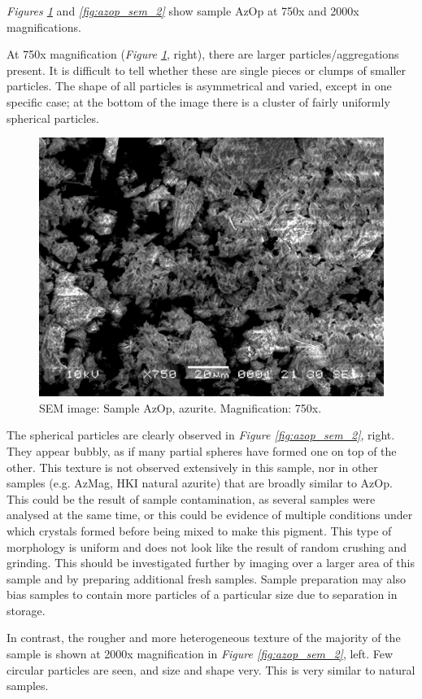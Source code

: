 
\textit{Figures \ref{fig:azop_sem_1}} and \textit{\ref{fig:azop_sem_2}} show sample AzOp at 750x and 2000x magnifications. 

At 750x magnification (\textit{Figure \ref{fig:azop_sem_1}}, right), there are larger particles/aggregations present. It is difficult to tell whether these are single pieces or clumps of smaller particles. The shape of all particles is asymmetrical and varied, except in one specific case; at the bottom of the image there is a cluster of fairly uniformly spherical particles. 

\begin{figure}[H]
\centering
  \includegraphics[width=.45\linewidth]{AzOp_x750_2_150321}
\caption[SEM image: Sample AzOp, azurite]{SEM image: Sample AzOp, azurite. Magnification: 750x.}
\label{fig:azop_sem_1}
\end{figure}

The spherical particles are clearly observed in \textit{Figure \ref{fig:azop_sem_2}}, right. They appear bubbly, as if many partial spheres have formed one on top of the other. This texture is not observed extensively in this sample, nor in other samples (e.g. AzMag, HKI natural azurite) that are broadly similar to AzOp. This could be the result of sample contamination, as several samples were analysed at the same time, or this could be evidence of multiple conditions under which crystals formed before being mixed to make this pigment. This type of morphology is uniform and does not look like the result of random crushing and grinding. This should be investigated further by imaging over a larger area of this sample and by preparing additional fresh samples. Sample preparation may also bias samples to contain more particles of a particular size due to separation in storage.

In contrast, the rougher and more heterogeneous texture of the majority of the sample is shown at 2000x magnification in \textit{Figure \ref{fig:azop_sem_2}}, left. Few circular particles are seen, and size and shape very. This is very similar to natural samples.

